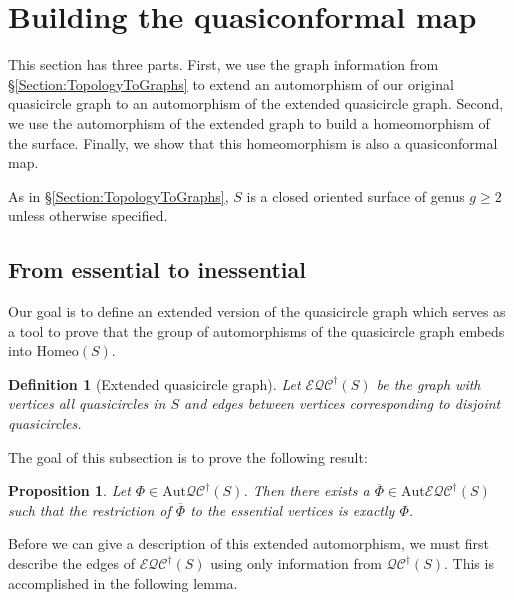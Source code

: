 \documentclass[12pt,a4paper]{amsart}
\theoremstyle{definition}
\theoremstyle{plain}
\newtheorem{proposition}[theorem]{Proposition}
\newtheorem{definition}[theorem]{Definition}
\numberwithin{equation}{section}
\newcommand{\qcg}{\mathcal{QC}^{\dagger}}
\newcommand{\eqcg}{\mathcal{E\!QC}^{\dagger}}
\newcommand{\Aut}{\mathrm{Aut}}
\begin{document}
\section{Building the quasiconformal map}\label{Section:BuildQCFromGraph}

This section has three parts. First, we use the graph information from \S\ref{Section:TopologyToGraphs} to extend an automorphism of our original quasicircle graph to an automorphism of the extended quasicircle graph. Second, we use the automorphism of the extended graph to build a homeomorphism of the surface. Finally, we show that this homeomorphism is also a quasiconformal map.

As in \S \ref{Section:TopologyToGraphs},  $S$ is a closed oriented surface of genus $g \geq 2$ unless otherwise specified.

\subsection{From essential to inessential}

Our goal is to define an extended version of the quasicircle graph which serves as a tool to prove that the group of automorphisms of the quasicircle graph embeds into $\mathrm{Homeo}(S)$.

\begin{definition}[Extended quasicircle graph]
    Let $\eqcg(S)$ be the graph with vertices
    all quasicircles in $S$ and edges between vertices corresponding to disjoint quasicircles.
\end{definition}

The goal of this subsection is to prove the following result:
\begin{proposition}\label{Prop:AutQuasiGraphToAutExtended}
    Let $\Phi \in \Aut \qcg(S)$. Then there exists a $\overline{\Phi} \in \Aut \eqcg(S)$ such that the restriction of $\overline{\Phi}$ to the essential vertices is exactly $\Phi$.
\end{proposition}

Before we can give a description of this extended automorphism, we must first  describe the edges of $\eqcg(S)$ using only information from $\qcg(S)$. This is accomplished in the following lemma.
\end{document}
